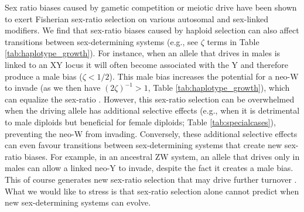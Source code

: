 \documentclass[12pt]{article}
\begin{document}
Sex ratio biases caused by gametic competition or meiotic drive have been shown to exert Fisherian sex-ratio selection on various autosomal \citep{Stalker:1961th,Smith:1975ft,Frank:1989vl,Hough:2013uo,Ubeda:2015fx, Otto:2015va} and sex-linked \citep{Ubeda:2015fx} modifiers.
We find that sex-ratio biases caused by haploid selection can also affect transitions between sex-determining systems (e.g., see $\zeta$ terms in Table \ref{tab:haplotype_growth}). 
For instance, when an allele that drives in males is linked to an XY locus it will often become associated with the Y and therefore produce a male bias ($\zeta<1/2$).
This male bias increases the potential for a neo-W to invade (as we then have $(2\zeta)^{-1}>1$, Table \ref{tab:haplotype_growth}), which can equalize the sex-ratio \citep[for a related example see][]{Ubeda:2015fx}.
However, this sex-ratio selection can be overwhelmed when the driving allele has additional selective effects (e.g., when it is detrimental to male diploids but beneficial for female diploids; Table \ref{tab:specialcases}), preventing the neo-W from invading. %
Conversely, these additional selective effects can even favour transitions between sex-determining systems that create new sex-ratio biases.
For example, in an ancestral ZW system, an allele that drives only in males can allow a linked neo-Y to invade, despite the fact it creates a male bias.
This of course generates new sex-ratio selection that may drive further turnover \citep{Ubeda:2015fx}.
What we would like to stress is that sex-ratio selection alone cannot predict when new sex-determining systems can evolve.

\end{document}

